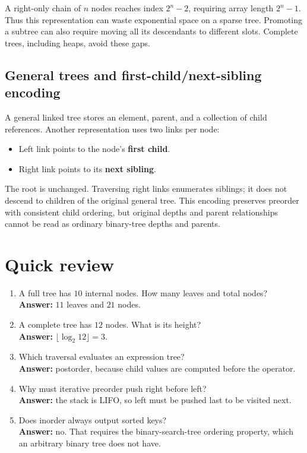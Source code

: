 \documentclass[11pt]{article}
\begin{document}
A right-only chain of $n$ nodes reaches index $2^n-2$, requiring array length $2^n-1$. Thus this representation can waste exponential space on a sparse tree. Promoting a subtree can also require moving all its descendants to different slots. Complete trees, including heaps, avoid these gaps.

\subsection{General trees and first-child/next-sibling encoding}
A general linked tree stores an element, parent, and a collection of child references. Another representation uses two links per node:
\begin{itemize}
\item Left link points to the node's \textbf{first child}.
\item Right link points to its \textbf{next sibling}.
\end{itemize}
The root is unchanged. Traversing right links enumerates siblings; it does not descend to children of the original general tree. This encoding preserves preorder with consistent child ordering, but original depths and parent relationships cannot be read as ordinary binary-tree depths and parents.

\section{Quick review}
\begin{enumerate}
\item A full tree has $10$ internal nodes. How many leaves and total nodes?\\
\textbf{Answer:} $11$ leaves and $21$ nodes.
\item A complete tree has $12$ nodes. What is its height?\\
\textbf{Answer:} $\lfloor\log_2 12\rfloor=3$.
\item Which traversal evaluates an expression tree?\\
\textbf{Answer:} postorder, because child values are computed before the operator.
\item Why must iterative preorder push right before left?\\
\textbf{Answer:} the stack is LIFO, so left must be pushed last to be visited next.
\item Does inorder always output sorted keys?\\
\textbf{Answer:} no. That requires the binary-search-tree ordering property, which an arbitrary binary tree does not have.
\end{enumerate}
\end{document}
